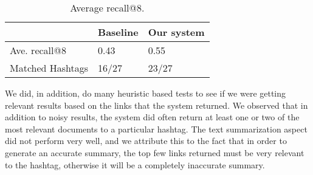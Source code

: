 \begin{table}[h]
    \centering
    \caption[Table caption text]{Average recall@8.}
    \label{table:recall}
    \begin{tabular}{ | l | l | l |} \hline
    & Baseline & Our system \\ \hline
    Ave. recall@8 & 0.43 & 0.55 \\ \hline
    Matched Hashtags & 16/27 & 23/27 \\ \hline
    \end{tabular}
\end{table}
We did, in addition, do many heuristic based tests to see if we were getting relevant results based on the links that the system returned. We observed that in addition to noisy results, the system did often return at least one or two of the most relevant documents to a particular hashtag. The text summarization aspect did not perform very well, and we attribute this to the fact that in order to generate an accurate summary, the top few links returned must be very relevant to the hashtag, otherwise it will be a completely inaccurate summary.\\